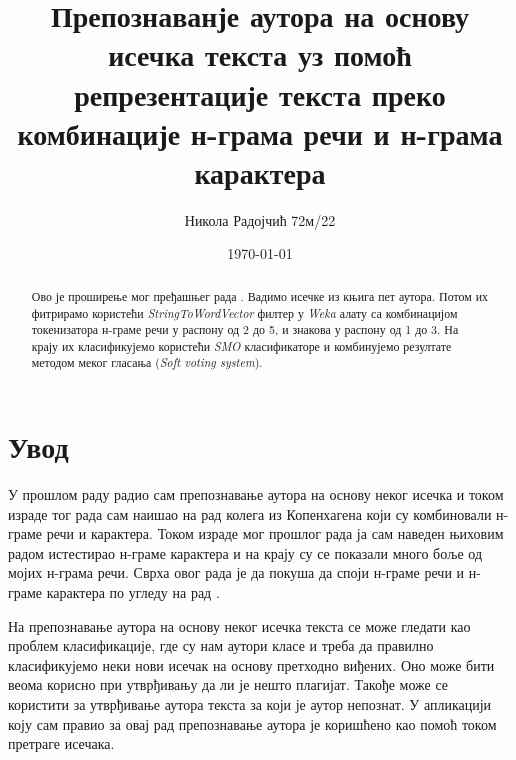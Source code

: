 \documentclass[11pt]{article}
\title{Препознаванје аутора на основу исечка текста уз помоћ репрезентације текста преко комбинације н-грама речи и н-грама карактера}
\author{Никола Радојчић 72м/22}
\date{\today}
\begin{document}
\maketitle

\begin{abstract}
Ово је проширење мог пређашњег рада \cite{MOJRAD}. Вадимо исечке из књига пет аутора. Потом их фитрирамо користећи \emph{StringToWordVector} филтер у \emph{Weka} алату са комбинацијом токенизатора н-граме речи у распону од 2 до 5, и знакова у распону од 1 до 3. На крају их класификујемо користећи \emph{SMO} класификаторе и комбинујемо резултате методом меког гласања (\emph{Soft voting system}).
\end{abstract}

\newpage

\tableofcontents

\newpage

\section{Увод}
У прошлом раду \cite{MOJRAD} радио сам препознавање аутора на основу неког исечка и током израде тог рада сам наишао на рад колега из Копенхагена \cite{COP} који су комбиновали н-граме речи и карактера. Током израде мог прошлог рада ја сам наведен њиховим радом истестирао н-граме карактера и на крају су се показали много боље од мојих н-грама речи. Сврха овог рада је да покуша да споји н-граме речи и н-граме карактера по угледу на рад \cite{COP}.

На препознавање аутора на основу неког исечка текста се може гледати као проблем класификације, где су нам аутори класе и треба да правилно класификујемо неки нови исечак на основу претходно виђених. Оно може бити веома корисно при утврђивању да ли је нешто плагијат. Такође може се користити за утврђивање аутора текста за који је аутор непознат. У апликацији коју сам правио за овај рад препознавање аутора је коришћено као помоћ током претраге исечака.

\newpage
\end{document}
